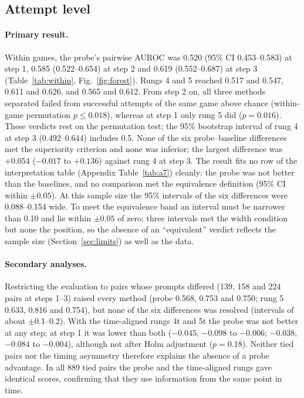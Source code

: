 \documentclass[11pt]{article}
\begin{document}
\subsection{Attempt level}\label{sec:attempt}
\paragraph{Primary result.} Within games, the probe's pairwise AUROC was 0.520 (95\% CI 0.453--0.583) at step 1, 0.585 (0.522--0.654) at step 2 and 0.619 (0.552--0.687) at step 3 (Table~\ref{tab:within}, Fig.~\ref{fig:forest}).
Rungs 4 and 5 reached 0.517 and 0.547, 0.611 and 0.626, and 0.565 and 0.612. From step 2 on, all three methods separated failed from successful attempts of the same game above chance
(within-game permutation $p \le 0.018$), whereas at step 1 only rung 5 did ($p = 0.016$). These verdicts rest on the permutation test; the 95\% bootstrap interval of rung 4 at step 3 (0.492--0.644) includes 0.5. None of the six probe--baseline differences met the superiority criterion and none was inferior;
the largest difference was $+0.054$ ($-0.017$ to $+0.136$) against rung 4 at step 3. The result fits no row of the interpretation table (Appendix Table~\ref{tab:a7}) cleanly: the probe was not better than the baselines,
and no comparison met the equivalence definition (95\% CI within $\pm 0.05$). At this sample size the 95\% intervals of the six differences were 0.088--0.154 wide. To meet the equivalence band an interval must be narrower than 0.10 and lie within $\pm 0.05$ of zero; three intervals met the width condition but none the position, so the absence of an ``equivalent'' verdict reflects the sample size (Section~\ref{sec:limits}) as well as the data.

\paragraph{Secondary analyses.} Restricting the evaluation to pairs whose prompts differed (139, 158 and 224 pairs at steps 1--3) raised every method (probe 0.568, 0.753 and 0.750; rung 5 0.633, 0.816 and 0.754),
but none of the six differences was resolved (intervals of about $\pm$0.1--0.2). With the time-aligned rungs 4t and 5t the probe was not better at any step; at step 1 it was lower than both
($-0.045$, $-0.098$ to $-0.006$; $-0.038$, $-0.084$ to $-0.004$), although not after Holm adjustment ($p = 0.18$). Neither tied pairs nor the timing asymmetry therefore explains the absence of a probe advantage.
In all 889 tied pairs the probe and the time-aligned rungs gave identical scores, confirming that they use information from the same point in time.
\end{document}
